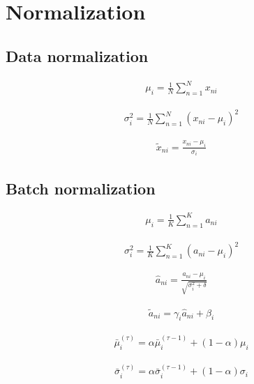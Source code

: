 \documentclass{article}
\begin{document}
\section{Normalization}

\subsection{Data normalization}

\begin{align*}
\mu_{i}=\frac{1}{N} \sum_{n=1}^{N} x_{n i}
\tag{7.48}
\end{align*}

\begin{align*}
\sigma_{i}^{2}=\frac{1}{N} \sum_{n=1}^{N}\left(x_{n i}-\mu_{i}\right)^{2}
\tag{7.49}
\end{align*}

\begin{align*}
\widetilde{x}_{n i}=\frac{x_{n i}-\mu_{i}}{\sigma_{i}}
\tag{7.50}
\end{align*}

\subsection{Batch normalization}

\begin{align*}
\mu_{i} =\frac{1}{K} \sum_{n=1}^{K} a_{n i}
\tag{7.52}
\end{align*}

\begin{align*}
\sigma_{i}^{2} =\frac{1}{K} \sum_{n=1}^{K}\left(a_{n i}-\mu_{i}\right)^{2}
\tag{7.53}
\end{align*}

\begin{align*}
\widehat{a}_{n i} =\frac{a_{n i}-\mu_{i}}{\sqrt{\sigma_{i}^{2}+\delta}}
\tag{7.54}
\end{align*}

\begin{align*}
\widetilde{a}_{n i}=\gamma_{i} \widehat{a}_{n i}+\beta_{i}
\tag{7.55}
\end{align*}

\begin{align*}
\bar{\mu}_{i}^{(\tau)}=\alpha \bar{\mu}_{i}^{(\tau-1)}+(1-\alpha) \mu_{i}
\tag{7.56}
\end{align*}

\begin{align*}
\bar{\sigma}_{i}^{(\tau)}=\alpha \bar{\sigma}_{i}^{(\tau-1)}+(1-\alpha) \sigma_{i}
\tag{7.57}
\end{align*}
\end{document}
